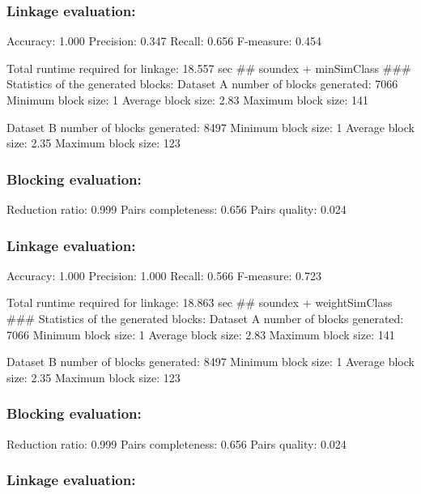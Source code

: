 \documentclass[
  letterpaper,
  DIV=11,
  numbers=noendperiod]{scrartcl}
\begin{document}
\hypertarget{linkage-evaluation-3}{%
\subsubsection{Linkage evaluation:}\label{linkage-evaluation-3}}

Accuracy: 1.000 Precision: 0.347 Recall: 0.656 F-measure: 0.454

Total runtime required for linkage: 18.557 sec \#\# soundex +
minSimClass \#\#\# Statistics of the generated blocks: Dataset A number
of blocks generated: 7066 Minimum block size: 1 Average block size: 2.83
Maximum block size: 141

Dataset B number of blocks generated: 8497 Minimum block size: 1 Average
block size: 2.35 Maximum block size: 123

\hypertarget{blocking-evaluation-4}{%
\subsubsection{Blocking evaluation:}\label{blocking-evaluation-4}}

Reduction ratio: 0.999 Pairs completeness: 0.656 Pairs quality: 0.024

\hypertarget{linkage-evaluation-4}{%
\subsubsection{Linkage evaluation:}\label{linkage-evaluation-4}}

Accuracy: 1.000 Precision: 1.000 Recall: 0.566 F-measure: 0.723

Total runtime required for linkage: 18.863 sec \#\# soundex +
weightSimClass \#\#\# Statistics of the generated blocks: Dataset A
number of blocks generated: 7066 Minimum block size: 1 Average block
size: 2.83 Maximum block size: 141

Dataset B number of blocks generated: 8497 Minimum block size: 1 Average
block size: 2.35 Maximum block size: 123

\hypertarget{blocking-evaluation-5}{%
\subsubsection{Blocking evaluation:}\label{blocking-evaluation-5}}

Reduction ratio: 0.999 Pairs completeness: 0.656 Pairs quality: 0.024

\hypertarget{linkage-evaluation-5}{%
\subsubsection{Linkage evaluation:}\label{linkage-evaluation-5}}
\end{document}
